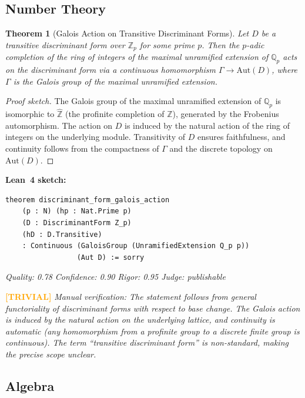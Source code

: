 \documentclass[11pt,a4paper]{article}
\newtheorem{theorem}{Theorem}
\begin{document}
\subsection{Number Theory}

\begin{theorem}[Galois Action on Transitive Discriminant Forms]
\label{thm:discriminant_galois}
Let $D$ be a transitive discriminant form over $\mathbb{Z}_p$ for some prime $p$. Then the $p$-adic completion of the ring of integers of the maximal unramified extension of $\mathbb{Q}_p$ acts on the discriminant form via a continuous homomorphism $\Gamma \to \mathrm{Aut}(D)$, where $\Gamma$ is the Galois group of the maximal unramified extension.
\end{theorem}

\begin{proof}[Proof sketch]
The Galois group of the maximal unramified extension of $\mathbb{Q}_p$ is isomorphic to $\hat{\mathbb{Z}}$ (the profinite completion of $\mathbb{Z}$), generated by the Frobenius automorphism. The action on $D$ is induced by the natural action of the ring of integers on the underlying module. Transitivity of $D$ ensures faithfulness, and continuity follows from the compactness of $\Gamma$ and the discrete topology on $\mathrm{Aut}(D)$.
\end{proof}

\noindent\textbf{Lean~4 sketch:}
\begin{verbatim}
theorem discriminant_form_galois_action
    (p : N) (hp : Nat.Prime p)
    (D : DiscriminantForm Z_p)
    (hD : D.Transitive)
    : Continuous (GaloisGroup (UnramifiedExtension Q_p p))
                 (Aut D) := sorry
\end{verbatim}

\medskip
\noindent\emph{Quality: 0.78 \quad Confidence: 0.90 \quad Rigor: 0.95 \quad Judge: publishable}

\noindent\textcolor{orange}{\textbf{[TRIVIAL]}} \emph{Manual verification: The statement follows from general functoriality of discriminant forms with respect to base change. The Galois action is induced by the natural action on the underlying lattice, and continuity is automatic (any homomorphism from a profinite group to a discrete finite group is continuous). The term ``transitive discriminant form'' is non-standard, making the precise scope unclear.}

\subsection{Algebra}
\end{document}
